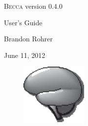 \documentclass[12pt,oneside]{book}
\begin{document}
\begin{centering}
\thispagestyle{empty}
\vspace{7cm}
{\huge \textsc{Becca} version 0.4.0 
\vspace{1cm}

User's Guide}
\vspace{4cm}

{\Large
Brandon Rohrer
\vspace{1cm}

June 11, 2012}

\vspace{4cm}

\begin{figure}[h]
\centering
\includegraphics[height=3cm]{figs/becca_logo.eps}
\end{figure}

\newpage
\end{centering}

\tableofcontents
\newpage

\addtolength{\parskip}{\baselineskip}

\setcounter{tocdepth}{0}











\appendix







%













\end{document}
